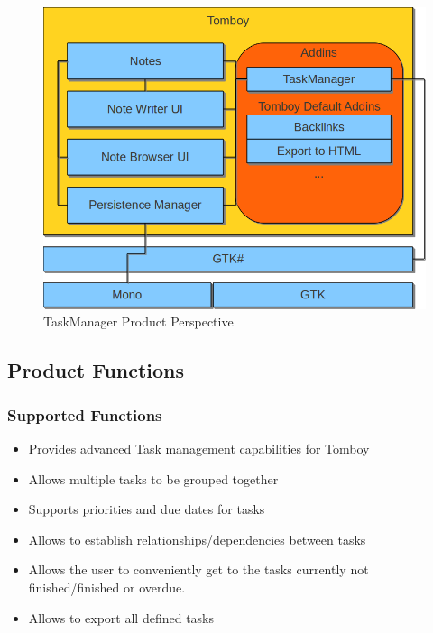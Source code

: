   
 
  \begin{figure}[ht]
    \includegraphics[width=\textwidth]{graphics/product_perspective_diagram.png}
    \caption{TaskManager Product Perspective}
    \label{perspective}
  \end{figure}


\subsection{Product Functions}
\label{description:functions}

  \subsubsection*{Supported Functions}
  \label{description:functions:supported}

    \begin{itemize}
      \item Provides advanced Task management capabilities for Tomboy
      \item Allows multiple tasks to be grouped together
      \item Supports priorities and due dates for tasks
      \item Allows to establish relationships/dependencies between tasks
      \item Allows the user to conveniently get to the tasks currently not finished/finished or overdue.
      \item Allows to export all defined tasks
    \end{itemize}

